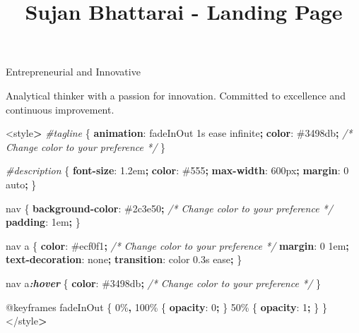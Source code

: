 \documentclass[
]{article}
\title{Sujan Bhattarai - Landing Page}
\author{}
\date{\vspace{-2.5em}}
\newenvironment{Shaded}{\begin{snugshade}}{\end{snugshade}}
\newcommand{\BuiltInTok}[1]{#1}
\newcommand{\CommentTok}[1]{\textcolor[rgb]{0.56,0.35,0.01}{\textit{#1}}}
\newcommand{\ConstantTok}[1]{\textcolor[rgb]{0.56,0.35,0.01}{#1}}
\newcommand{\DataTypeTok}[1]{\textcolor[rgb]{0.13,0.29,0.53}{#1}}
\newcommand{\DecValTok}[1]{\textcolor[rgb]{0.00,0.00,0.81}{#1}}
\newcommand{\ImportTok}[1]{#1}
\newcommand{\InformationTok}[1]{\textcolor[rgb]{0.56,0.35,0.01}{\textbf{\textit{#1}}}}
\newcommand{\KeywordTok}[1]{\textcolor[rgb]{0.13,0.29,0.53}{\textbf{#1}}}
\newcommand{\NormalTok}[1]{#1}
\newcommand{\OperatorTok}[1]{\textcolor[rgb]{0.81,0.36,0.00}{\textbf{#1}}}
\newcommand{\PreprocessorTok}[1]{\textcolor[rgb]{0.56,0.35,0.01}{\textit{#1}}}
\begin{document}
\maketitle

\hypertarget{ppc}{}
Entrepreneurial and Innovative

Analytical thinker with a passion for innovation. Committed to
excellence and continuous improvement.

\begin{Shaded}
\begin{Highlighting}[]
\NormalTok{\textless{}style}\OperatorTok{\textgreater{}}
  \PreprocessorTok{\#tagline}\NormalTok{ \{}
    \KeywordTok{animation}\NormalTok{: fadeInOut }\DecValTok{1}\DataTypeTok{s} \DecValTok{ease} \DecValTok{infinite}\OperatorTok{;}
    \KeywordTok{color}\NormalTok{: }\ConstantTok{\#3498db}\OperatorTok{;} \CommentTok{/* Change color to your preference */}
\NormalTok{  \}}

  \PreprocessorTok{\#description}\NormalTok{ \{}
    \KeywordTok{font{-}size}\NormalTok{: }\DecValTok{1.2}\DataTypeTok{em}\OperatorTok{;}
    \KeywordTok{color}\NormalTok{: }\ConstantTok{\#555}\OperatorTok{;}
    \KeywordTok{max{-}width}\NormalTok{: }\DecValTok{600}\DataTypeTok{px}\OperatorTok{;}
    \KeywordTok{margin}\NormalTok{: }\DecValTok{0} \BuiltInTok{auto}\OperatorTok{;}
\NormalTok{  \}}

\NormalTok{  nav \{}
    \KeywordTok{background{-}color}\NormalTok{: }\ConstantTok{\#2c3e50}\OperatorTok{;} \CommentTok{/* Change color to your preference */}
    \KeywordTok{padding}\NormalTok{: }\DecValTok{1}\DataTypeTok{em}\OperatorTok{;}
\NormalTok{  \}}

\NormalTok{  nav a \{}
    \KeywordTok{color}\NormalTok{: }\ConstantTok{\#ecf0f1}\OperatorTok{;} \CommentTok{/* Change color to your preference */}
    \KeywordTok{margin}\NormalTok{: }\DecValTok{0} \DecValTok{1}\DataTypeTok{em}\OperatorTok{;}
    \KeywordTok{text{-}decoration}\NormalTok{: }\DecValTok{none}\OperatorTok{;}
    \KeywordTok{transition}\NormalTok{: color }\DecValTok{0.3}\DataTypeTok{s} \DecValTok{ease}\OperatorTok{;}
\NormalTok{  \}}

\NormalTok{  nav a}\InformationTok{:hover}\NormalTok{ \{}
    \KeywordTok{color}\NormalTok{: }\ConstantTok{\#3498db}\OperatorTok{;} \CommentTok{/* Change color to your preference */}
\NormalTok{  \}}

  \ImportTok{@keyframes}\NormalTok{ fadeInOut \{}
\NormalTok{    0\%}\OperatorTok{,}\NormalTok{ 100\% \{}
      \KeywordTok{opacity}\NormalTok{: }\DecValTok{0}\OperatorTok{;}
\NormalTok{    \}}
\NormalTok{    50\% \{}
      \KeywordTok{opacity}\NormalTok{: }\DecValTok{1}\OperatorTok{;}
\NormalTok{    \}}
\NormalTok{  \}}
\NormalTok{\textless{}/style}\OperatorTok{\textgreater{}}
\end{Highlighting}
\end{Shaded}
\end{document}
